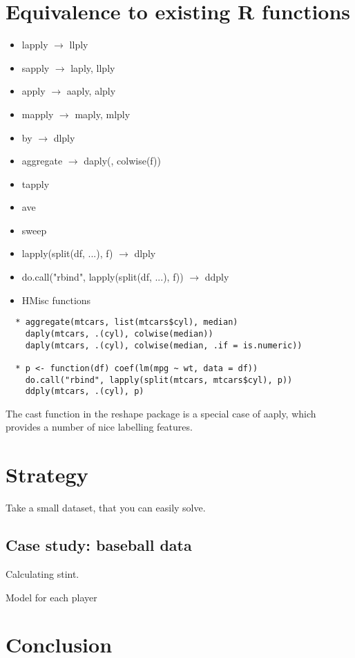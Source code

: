 \documentclass[letterpaper,oneside]{scrartcl}
\begin{document}
\section{Equivalence to existing R functions}

\begin{itemize}
  \item lapply $\to$ llply
  \item sapply $\to$ laply, llply
  \item apply  $\to$ aaply, alply
  \item mapply $\to$ maply, mlply
  \item by $\to$ dlply
  \item aggregate $\to$ daply(, colwise(f))
  \item tapply 
  \item ave 
  \item sweep
  \item lapply(split(df, ...), f) $\to$ dlply
  \item do.call("rbind", lapply(split(df, ...), f)) $\to$ ddply
  \item HMisc functions
\end{itemize}

\begin{verbatim}
  * aggregate(mtcars, list(mtcars$cyl), median)
    daply(mtcars, .(cyl), colwise(median))
    daply(mtcars, .(cyl), colwise(median, .if = is.numeric))
    
  * p <- function(df) coef(lm(mpg ~ wt, data = df))
    do.call("rbind", lapply(split(mtcars, mtcars$cyl), p))
    ddply(mtcars, .(cyl), p)  
\end{verbatim}

The cast function in the reshape package \citep{reshape} is a special case of aaply, which provides a number of nice labelling features.

\section{Strategy}

Take a small dataset, that you can easily solve.  

\subsection{Case study: baseball data}

Calculating stint.  

Model for each player

\section{Conclusion}



\end{document}
